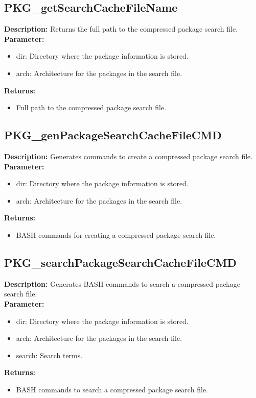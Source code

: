 \subsection{PKG\_getSearchCacheFileName}
\textbf{Description:} Returns the full path to the compressed package search file.\\
\textbf{Parameter:}
\begin{itemize}
\item dir: Directory where the package information is stored.
\item arch: Architecture for the packages in the search file.
\end{itemize}
\textbf{Returns:}
\begin{itemize}
\item Full path to the compressed package search file.
\end{itemize}

\subsection{PKG\_genPackageSearchCacheFileCMD}
\textbf{Description:} Generates commands to create a compressed package search file.\\
\textbf{Parameter:}
\begin{itemize}
\item dir: Directory where the package information is stored.
\item arch: Architecture for the packages in the search file.
\end{itemize}
\textbf{Returns:}
\begin{itemize}
\item BASH commands for creating a compressed package search file.
\end{itemize}

\subsection{PKG\_searchPackageSearchCacheFileCMD}
\textbf{Description:} Generates BASH commands to search a compressed package search file.\\
\textbf{Parameter:}
\begin{itemize}
\item dir: Directory where the package information is stored.
\item arch: Architecture for the packages in the search file.
\item search: Search terms.
\end{itemize}
\textbf{Returns:}
\begin{itemize}
\item BASH commands to search a compressed package search file.
\end{itemize}

